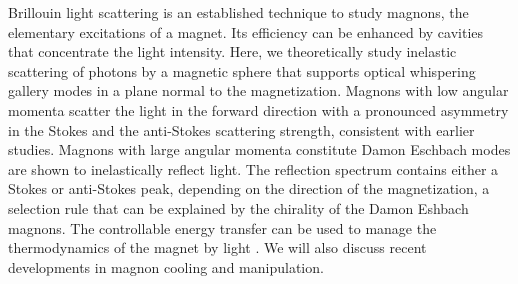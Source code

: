 Brillouin light scattering is an established technique to study magnons, the elementary excitations of a magnet. Its efficiency can be enhanced by cavities that concentrate the light intensity. Here, we theoretically study inelastic scattering of photons by a magnetic sphere that supports optical whispering gallery modes in a plane normal to the magnetization. Magnons with low angular momenta scatter the light in the forward direction with a pronounced asymmetry in the Stokes and the anti-Stokes scattering strength, consistent with earlier studies. Magnons with large angular momenta constitute Damon Eschbach modes are shown to inelastically reflect light. The reflection spectrum contains either a Stokes or anti-Stokes peak, depending on the direction of the magnetization, a selection rule that can be explained by the chirality of the Damon Eshbach magnons. The controllable energy transfer can be used to manage the thermodynamics of the magnet by light \cite{Sharma_2017}. We will also discuss recent developments in magnon cooling and manipulation.